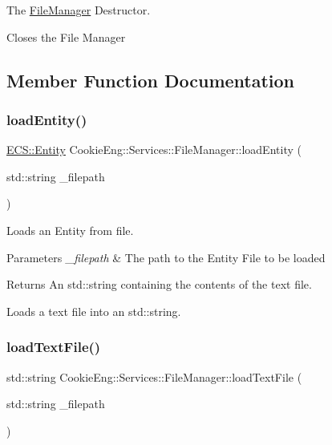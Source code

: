 The \hyperlink{class_cookie_eng_1_1_services_1_1_file_manager}{File\+Manager} Destructor. 

Closes the File Manager 

\subsection{Member Function Documentation}
\mbox{\label{class_cookie_eng_1_1_services_1_1_file_manager_aa9d81e3a19c47774c1c1f15f27e688a4}} 
\subsubsection{\texorpdfstring{load\+Entity()}{loadEntity()}}
{\footnotesize\ttfamily \hyperlink{class_cookie_eng_1_1_e_c_s_1_1_entity}{E\+C\+S\+::\+Entity} Cookie\+Eng\+::\+Services\+::\+File\+Manager\+::load\+Entity (\begin{DoxyParamCaption}\item[{std\+::string}]{\+\_\+filepath }\end{DoxyParamCaption})}



Loads an Entity from file. 


\begin{DoxyParams}{Parameters}
{\em \+\_\+filepath} & The path to the Entity File to be loaded \\
\hline
\end{DoxyParams}
\begin{DoxyReturn}{Returns}
An std\+::string containing the contents of the text file.
\end{DoxyReturn}
Loads a text file into an std\+::string. \mbox{\label{class_cookie_eng_1_1_services_1_1_file_manager_a744bde422e66fcfbfcc379a21ae90500}} 
\subsubsection{\texorpdfstring{load\+Text\+File()}{loadTextFile()}}
{\footnotesize\ttfamily std\+::string Cookie\+Eng\+::\+Services\+::\+File\+Manager\+::load\+Text\+File (\begin{DoxyParamCaption}\item[{std\+::string}]{\+\_\+filepath }\end{DoxyParamCaption})}



